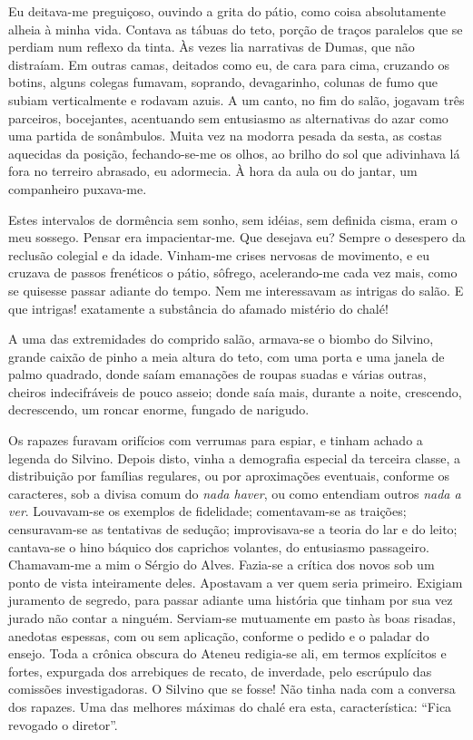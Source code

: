 Eu deitava{}-me
preguiçoso, ouvindo a grita do pátio, como coisa absolutamente alheia à
minha vida. Contava as tábuas do teto, porção de traços paralelos que
se perdiam num reflexo da tinta. Às vezes lia narrativas de Dumas, que
não distraíam. Em outras camas, deitados como eu, de cara para cima,
cruzando os botins, alguns colegas fumavam, soprando, devagarinho,
colunas de fumo que subiam verticalmente e rodavam azuis. A um canto,
no fim do salão, jogavam três parceiros, bocejantes, acentuando sem
entusiasmo as alternativas do azar como uma partida de sonâmbulos.
Muita vez na modorra pesada da sesta, as costas aquecidas da posição,
fechando{}-se{}-me os olhos, ao brilho do sol que adivinhava lá fora no
terreiro abrasado, eu adormecia. À hora da aula ou do jantar, um
companheiro puxava{}-me. 

Estes intervalos de dormência sem sonho, sem
idéias, sem definida cisma, eram o meu sossego. Pensar era
impacientar{}-me. Que desejava eu? Sempre o desespero da reclusão
colegial e da idade. Vinham{}-me crises nervosas de movimento, e eu
cruzava de passos frenéticos o pátio, sôfrego, acelerando{}-me cada vez
mais, como se quisesse passar adiante do tempo. Nem me interessavam as
intrigas do salão. E que intrigas! exatamente a substância do afamado
mistério do chalé! 

A uma das extremidades do comprido salão,
armava{}-se o biombo do Silvino, grande caixão de pinho a meia altura
do teto, com uma porta e uma janela de palmo quadrado, donde saíam
emanações de roupas suadas e várias outras, cheiros indecifráveis de
pouco asseio; donde saía mais, durante a noite, crescendo, decrescendo,
um roncar enorme, fungado de narigudo. 

Os rapazes furavam orifícios com
verrumas para espiar, e tinham achado a legenda do Silvino. Depois
disto, vinha a demografia especial da terceira classe, a distribuição
por famílias regulares, ou por aproximações eventuais, conforme os
caracteres, sob a divisa comum do \textit{nada haver}, ou como entendiam outros
\textit{nada a ver}. Louvavam{}-se os exemplos de fidelidade; comentavam{}-se as
traições; censuravam{}-se as tentativas de sedução; improvisava{}-se a
teoria do lar e do leito; cantava{}-se o hino báquico dos caprichos
volantes, do entusiasmo passageiro. Chamavam{}-me a mim o Sérgio do
Alves. Fazia{}-se a crítica dos novos sob um ponto de vista
inteiramente deles. Apostavam a ver quem seria primeiro. Exigiam
juramento de segredo, para passar adiante uma história que tinham por
sua vez jurado não contar a ninguém. Serviam{}-se mutuamente em pasto
às boas risadas, anedotas espessas, com ou sem aplicação, conforme o
pedido e o paladar do ensejo. Toda a crônica obscura do Ateneu
redigia{}-se ali, em termos explícitos e fortes, expurgada dos
arrebiques de recato, de inverdade, pelo escrúpulo das comissões
investigadoras. O Silvino que se fosse! Não tinha nada com a conversa
dos rapazes. Uma das melhores máximas do chalé era esta, característica: 
``Fica revogado o diretor''. 

